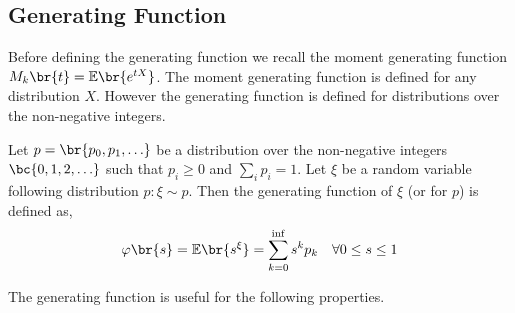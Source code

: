 \documentclass{article}
\newcommand{\Exp}{\mathbb{E}}
\newcommand{\Mom}{M}
\begin{document}
    \subsection{Generating Function}
    Before defining the generating function we recall the moment generating function $\Mom_k\br{t} = \Exp\br{e^{t X}}$. The moment generating function is defined for any distribution $X$. However the generating function is defined for distributions over the non-negative integers.
    \begin{definition}
        Let $p = \br{p_0, p_1, \ldots}$ be a distribution over the non-negative integers $\bc{0,1,2,\ldots}$ such that $p_i \geq 0$ and $\sum_{i} p_i = 1$. Let $\xi$ be a random variable following distribution $p : \xi \sim p$. Then the generating function of $\xi$ (or for $p$) is defined as,
        \[ \varphi\br{s} = \Exp\br{s^{\xi}} = \sum_{k = 0}^{\inf} s^k p_k \quad \forall 0 \leq s \leq 1\]
    \end{definition}
    The generating function is useful for the following properties.
\end{document}
